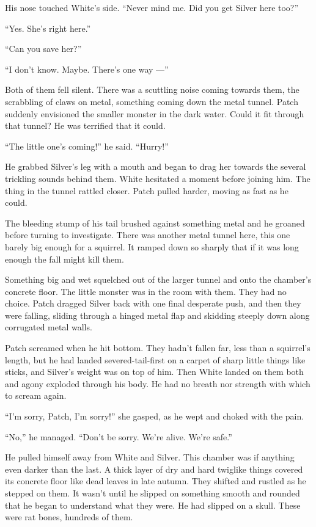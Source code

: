 \documentclass[ebook,oneside,openany,17pt]{memoir}
\newenvironment{tolerant}[1]{%
  \par\tolerance=#1\relax
}{%
  \par
}
\begin{document}
His nose touched White’s side. “Never mind me. Did you get Silver here
too?”

“Yes. She’s right here.”

“Can you save her?”

“I don’t know. Maybe. There’s one way —”

Both of them fell silent. There was a scuttling noise coming towards
them, the scrabbling of claws on metal, something coming down the
metal tunnel. Patch suddenly envisioned the smaller monster in the
dark water. Could it fit through that tunnel? He was terrified that it
could.

“The little one’s coming!” he said. “Hurry!”

He grabbed Silver’s leg with a mouth and began to drag her towards the
several trickling sounds behind them. White hesitated a moment before
joining him. The thing in the tunnel rattled closer. Patch pulled
harder, moving as fast as he could.

The bleeding stump of his tail brushed against something metal and he
groaned before turning to investigate. There was another metal tunnel
here, this one barely big enough for a squirrel. It ramped down so
sharply that if it was long enough the fall might kill them.

\begin{tolerant}{1000}
Something big and wet squelched out of the larger tunnel and onto the
chamber’s concrete floor. The little monster was in the room with
them. They had no choice. Patch dragged Silver back with one final
desperate push, and then they were falling, sliding through a hinged
metal flap and skidding steeply down along corrugated metal walls.
\end{tolerant}

Patch screamed when he hit bottom. They hadn’t fallen far, less than a
squirrel’s length, but he had landed severed-tail-first on a carpet of
sharp little things like sticks, and Silver’s weight was on top of
him. Then White landed on them both and agony exploded through his
body. He had no breath nor strength with which to scream again.

“I’m sorry, Patch, I’m sorry!” she gasped, as he wept and choked with
the pain.

“No,” he managed. “Don’t be sorry. We’re alive. We’re safe.”

\begin{tolerant}{1000}
He pulled himself away from White and Silver. This chamber was if
anything even darker than the last. A thick layer of dry and hard
twiglike things covered its concrete floor like dead leaves in late
autumn. They shifted and rustled as he stepped on them. It wasn’t
until he slipped on something smooth and rounded that he began to
understand what they were. He had slipped on a skull. These were rat
bones, hundreds of them.
\end{tolerant}
\end{document}

